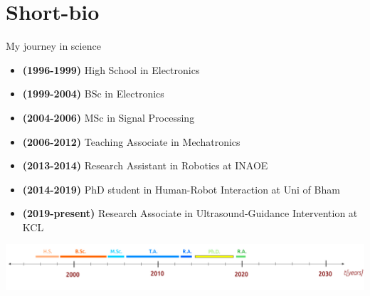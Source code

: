 \section{Short-bio}


\begin{frame}{My journey in science}

\begin{itemize}	
	\item \textbf{(1996-1999)} High School in Electronics
	\item \textbf{(1999-2004)} BSc in Electronics  
	\item \textbf{(2004-2006)} MSc in Signal Processing 
	\item \textbf{(2006-2012)} Teaching Associate in Mechatronics 
	\item \textbf{(2013-2014)} Research Assistant in Robotics at INAOE  
	\item \textbf{(2014-2019)} PhD student in Human-Robot Interaction at Uni of Bham \\
	\item \textbf{(2019-present)} Research Associate in Ultrasound-Guidance 
	Intervention at KCL 
\end{itemize}

	\vspace{4mm}
        \includegraphics[width=\linewidth]{./figs/myjourney/versions/drawing.png}

\end{frame}






